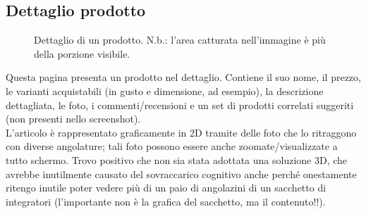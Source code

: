 \subsection{Dettaglio prodotto}
\begin{figure}[!htb]
	\caption{\label{fig:figura9}} Dettaglio di un prodotto. N.b.: l'area catturata nell'immagine è più della porzione visibile.
\end{figure}
Questa pagina presenta un prodotto nel dettaglio. Contiene il suo nome, il prezzo, le varianti acquistabili (in gusto e dimensione, ad esempio), la descrizione dettagliata, le foto, i commenti/recensioni e un set di prodotti correlati suggeriti (non presenti nello screenshot).\\ 
L'articolo è rappresentato graficamente in 2D tramite delle foto che lo ritraggono con diverse angolature; tali foto possono essere anche zoomate/visualizzate a tutto schermo. Trovo positivo che non sia stata adottata una soluzione 3D, che avrebbe inutilmente causato del sovraccarico cognitivo anche perché onestamente ritengo inutile poter vedere più di un paio di angolazini di un sacchetto di integratori (l'importante non è la grafica del sacchetto, ma il contenuto!!).\\
